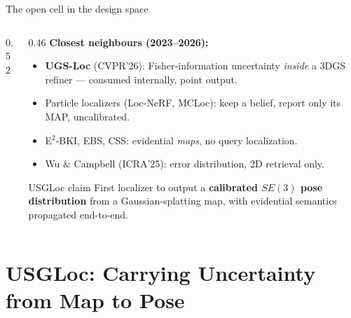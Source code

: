 \documentclass[aspectratio=169,10pt]{beamer}
\def\figpath{figures/}
\newcommand{\method}{USGLoc}
\newcommand{\bad}[1]{{\color{uHigh}#1}}
\begin{document}
\begin{frame}{The open cell in the design space}
  \begin{columns}[T]
    \begin{column}{0.52\textwidth}
      \centering
      \resizebox{\linewidth}{!}{}
    \end{column}
    \begin{column}{0.46\textwidth}
      \small
      \textbf{Closest neighbours (2023--2026):}
      \begin{itemize}
        \item \textbf{UGS-Loc} (CVPR'26): Fisher-information uncertainty
              \emph{inside} a 3DGS refiner --- consumed internally,
              \bad{point output}.
        \item Particle localizers (Loc-NeRF, MCLoc): keep a belief,
              \bad{report only its MAP, uncalibrated}.
        \item E$^2$-BKI, EBS, CSS: evidential \emph{maps},
              \bad{no query localization}.
        \item Wu \& Campbell (ICRA'25): error distribution, \bad{2D retrieval
              only}.
      \end{itemize}
      \vspace{1mm}
      \begin{block}{\method{} claim}
        First localizer to output a \textbf{calibrated $SE(3)$ pose
        distribution} from a Gaussian-splatting map, with evidential
        semantics propagated end-to-end.
      \end{block}
    \end{column}
  \end{columns}
\end{frame}

\section{\method{}: Carrying Uncertainty from Map to Pose}
\end{document}
